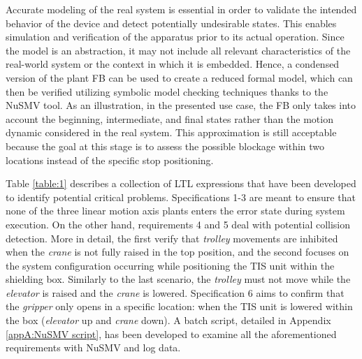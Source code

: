 \documentclass{ieeeojies}
\begin{document}
Accurate modeling of the real system is essential in order to validate the  intended behavior of the device and detect potentially undesirable states. This enables simulation and verification of the apparatus prior to its actual operation. Since the model is an abstraction, it may not include all relevant characteristics of the real-world system or the context in which it is embedded. Hence, a condensed version of the plant FB can be used to create a reduced formal model, which can then be verified utilizing symbolic model checking techniques thanks to the NuSMV tool.
As an illustration, in the presented use case, the  FB only takes into account the beginning, intermediate, and final states rather than the motion dynamic considered in the real system. 
This approximation is still acceptable because the goal at this stage is to assess the possible blockage within two locations instead of the specific stop positioning. 

Table \ref{table:1} describes a collection of LTL expressions that have been developed to identify potential critical problems.
Specifications 1-3 are meant to ensure that none of the three linear motion axis plants enters the error state during system execution. On the other hand, requirements 4 and 5 deal with potential collision detection. More in detail, the first verify that \textit{trolley} movements are inhibited when the \textit{crane} is not fully raised in the top position, and the second focuses on the system configuration occurring while positioning the TIS unit within the shielding box. Similarly to the last scenario, the \textit{trolley} must not move while the \textit{elevator} is raised and the \textit{crane} is lowered.
Specification 6 aims to confirm that the \textit{gripper} only opens in a specific location: when the TIS unit is lowered within the box (\textit{elevator} up and \textit{crane} down). 
A batch script, detailed in Appendix \ref{appA:NuSMV script}, has been developed to examine all the aforementioned requirements with NuSMV and log data.
\end{document}
